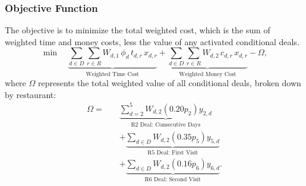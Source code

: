 \documentclass{article}
\begin{document}
\subsubsection*{Objective Function}
The objective is to minimize the total weighted cost, which is the sum of weighted time and money costs, less the value of any activated conditional deals.
\begin{equation}
\min \quad \underbrace{\sum_{d \in D} \sum_{r \in R} W_{d,1} \, \phi_d \, t_{d,r} \,x_{d,r}}_{\text{Weighted Time Cost}} + \underbrace{\sum_{d \in D} \sum_{r \in R} W_{d,2} \, c_{d,r} \, x_{d,r}}_{\text{Weighted Money Cost}} - \Omega ,
\label{eq:obj}
\end{equation}
where $\Omega$ represents the total weighted value of all conditional deals, broken down by restaurant:
\begin{align*}
\Omega = 
\quad &\underbrace{\sum_{d=2}^{5} W_{d,2} (0.20 p_2) y_{2,d}}_{\text{R2 Deal: Consecutive Days}} \\
&+ \underbrace{\sum_{d \in D} W_{d,2} (0.35 p_5) y_{5,d}}_{\text{R5 Deal: First Visit}} \\
&+ \underbrace{\sum_{d \in D} W_{d,2} (0.16 p_6) y_{6,d}}_{\text{R6 Deal: Second Visit}}.
\end{align*}
\end{document}
